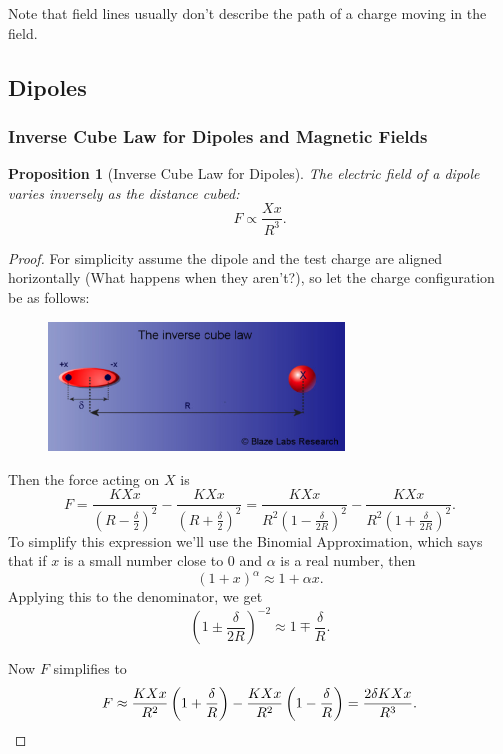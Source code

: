 \documentclass[12pt]{article}
\theoremstyle{plain}
\newtheorem{proposition}[theorem]{Proposition}
\theoremstyle{definition}
\theoremstyle{remark}
\begin{document}
Note that field lines usually don't describe the path of a charge moving in the
field.

\subsection{Dipoles}

\subsubsection{Inverse Cube Law for Dipoles and Magnetic Fields}

\begin{mdframed}
\begin{proposition}[Inverse Cube Law for Dipoles]
The electric field of a dipole varies inversely as the distance cubed: $$F \propto \frac{Xx}{R^3}.$$
\end{proposition}
\end{mdframed}

\begin{proof}
For simplicity assume the dipole and the test charge are aligned horizontally (What happens when they aren't?), so let the charge configuration be as follows:
\begin{figure}[H]
\centering
\includegraphics[width=0.7\textwidth]{inversecubedipole}
\end{figure}

Then the force acting on $X$ is $$F = \frac{KXx}{(R - \frac{\delta}{2})^2} - \frac{KXx}{(R + \frac{\delta}{2})^2} = \frac{KXx}{R^2(1 - \frac{\delta}{2R})^2} - \frac{KXx}{R^2(1 + \frac{\delta}{2R})^2}.$$
To simplify this expression we'll use the Binomial Approximation, which says that if $x$ is a small number close to 0 and $\alpha$ is a real number, then $$(1 + x)^\alpha \approx 1 + \alpha x.$$
Applying this to the denominator, we get $$\left(1 \pm \frac{\delta}{2R}\right)^{-2} \approx 1 \mp \frac{\delta}{R}.$$

Now $F$ simplifies to $$
F \approx \frac{KXx}{R^2}\left(1 + \frac{\delta}{R}\right) - \frac{KXx}{R^2}\left(1 - \frac{\delta}{R}\right) = \frac{2\delta KXx}{R^3}. \qedhere
$$
\end{proof}
\end{document}
